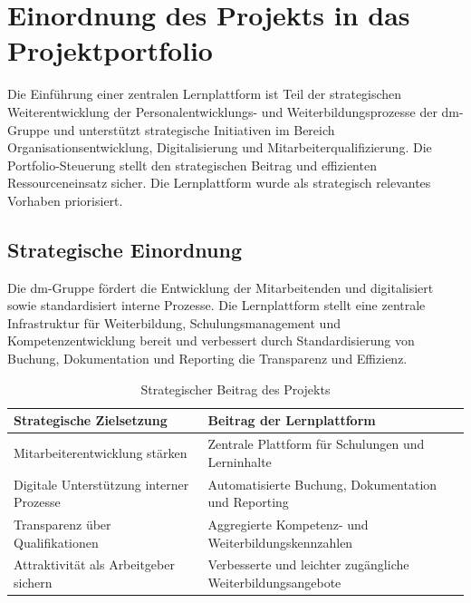 
\chapter{Einordnung des Projekts in das Projektportfolio}

Die Einführung einer zentralen Lernplattform ist Teil der strategischen Weiterentwicklung
der Personalentwicklungs- und Weiterbildungsprozesse der dm-Gruppe und unterstützt
strategische Initiativen im Bereich Organisationsentwicklung, Digitalisierung und
Mitarbeiterqualifizierung. Die Portfolio-Steuerung stellt den strategischen Beitrag
und effizienten Ressourceneinsatz sicher. Die Lernplattform wurde als strategisch
relevantes Vorhaben priorisiert.

\section{Strategische Einordnung}

Die dm-Gruppe fördert die Entwicklung der Mitarbeitenden und digitalisiert sowie standardisiert interne Prozesse. Die Lernplattform stellt eine zentrale Infrastruktur für Weiterbildung, Schulungsmanagement und Kompetenzentwicklung bereit und verbessert durch Standardisierung von Buchung, Dokumentation und Reporting die Transparenz und Effizienz.

\begin{xltabular}{\textwidth}{@{}lX@{}}
    \caption{Strategischer Beitrag des Projekts} \label{tab:strategischer-beitrag} \\
    \hline
    \textbf{Strategische Zielsetzung}        & \textbf{Beitrag der Lernplattform}                          \\
    \hline
    Mitarbeiterentwicklung stärken           & Zentrale Plattform für Schulungen und Lerninhalte           \\

    Digitale Unterstützung interner Prozesse & Automatisierte Buchung, Dokumentation und Reporting         \\

    Transparenz über Qualifikationen         & Aggregierte Kompetenz- und Weiterbildungskennzahlen         \\

    Attraktivität als Arbeitgeber sichern    & Verbesserte und leichter zugängliche Weiterbildungsangebote \\
    \hline
\end{xltabular}

